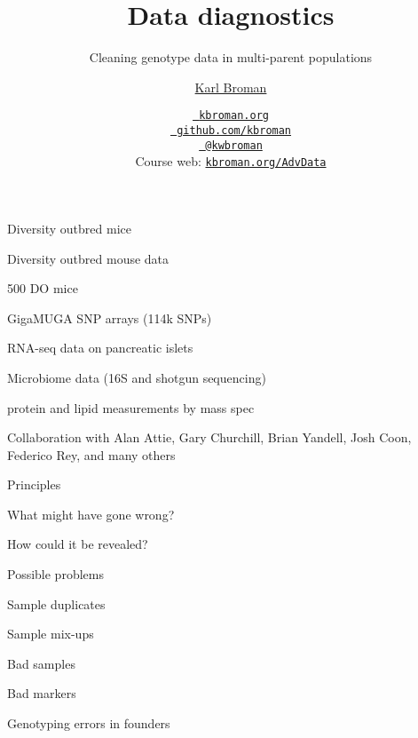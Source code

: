 \documentclass[aspectratio=169,12pt,t]{beamer}
\title{Data diagnostics}
\subtitle{Cleaning genotype data in multi-parent populations}
\author{\href{https://kbroman.org}{Karl Broman}}
\institute{Biostatistics \& Medical Informatics, UW{\textendash}Madison}
\date{\href{https://kbroman.org}{\tt \scriptsize \color{foreground} kbroman.org}
\\[-4pt]
\href{https://github.com/kbroman}{\tt \scriptsize \color{foreground} github.com/kbroman}
\\[-4pt]
\href{https://twitter.com/kwbroman}{\tt \scriptsize \color{foreground} @kwbroman}
\\[-4pt]
{\scriptsize Course web: \href{https://kbroman.org/AdvData}{\tt kbroman.org/AdvData}}
}
\begin{document}
{
\frame{
  \titlepage

\note{
}
} }



\begin{frame}[c]{Diversity outbred mice}

\end{frame}


\begin{frame}{Diversity outbred mouse data}

  \bbi
  \item 500 DO mice
  \item GigaMUGA SNP arrays (114k SNPs)
  \item RNA-seq data on pancreatic islets
  \item Microbiome data (16S and shotgun sequencing)
  \item protein and lipid measurements by mass spec
  \item Collaboration with Alan Attie, Gary Churchill, Brian Yandell,
    Josh Coon, Federico Rey, and many others
    \ei

\note{
}

\end{frame}


\begin{frame}{Principles}

  \bbi
\item What might have gone wrong?
  \item How could it be revealed?
\ei

\note{
}

\end{frame}


\begin{frame}{Possible problems}

\bbi
\item Sample duplicates
\item Sample mix-ups
\item Bad samples
\item Bad markers
\item Genotyping errors in founders
  \ei

\note{
}

\end{frame}
\end{document}
